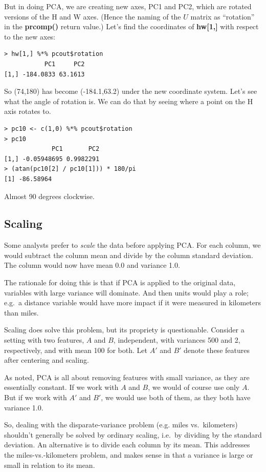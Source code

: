 But in doing PCA, we are creating new axes, PC1 and PC2, which are
rotated versions of the H and W axes.  (Hence the naming of the $U$
matrix as ``rotation'' in the \textbf{prcomp()} return value.)  Let's
find the coordinates of \textbf{hw[1,]} with respect to the new axes:

\begin{lstlisting}
> hw[1,] %*% pcout$rotation
           PC1     PC2
[1,] -184.0833 63.1613
\end{lstlisting}

So (74,180) has become (-184.1,63.2) under the new coordinate
system.  Let's see what the angle of rotation is. We can do that by
seeing where a point on the H axis rotates to.

\begin{lstlisting}
> pc10 <- c(1,0) %*% pcout$rotation
> pc10
             PC1       PC2
[1,] -0.05948695 0.9982291
> (atan(pc10[2] / pc10[1])) * 180/pi
[1] -86.58964
\end{lstlisting}

Almost 90 degrees clockwise.

\subsection{Scaling}

Some analysts prefer to \textit{scale} the data before applying PCA.
For each column, we would subtract the column mean and divide by the
column standard deviation.  The column would now have mean 0.0 and
variance 1.0.

The rationale for doing this is that if PCA is applied to the original
data, variables with large variance will dominate.  And then units would
play a role; e.g.\ a distance variable would have more impact if it were
measured in kilometers than miles.

Scaling does solve this problem, but its propriety is questionable.
Consider a setting with two features, $A$ and $B$, independent, with
variances 500 and 2, respectively, and with mean 100 for both.  Let $A'$
and $B'$ denote these features after centering and scaling.

As noted, PCA is all about removing features with small variance, as
they are essentially constant. If we work with $A$ and $B$, we would of
course use only $A$. But if we work with $A'$ and $B'$, we would use
both of them, as they both have variance 1.0.

So, dealing with the disparate-variance problem (e.g. miles vs.\
kilometers) shouldn't generally be solved by ordinary scaling, i.e.\ by
dividing by the standard deviation.  An alternative is to divide each
column by its mean.  This addresses the miles-vs.-kilometers problem,
and makes sense in that a variance is large or small in relation to its
mean.

